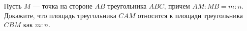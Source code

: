 \begin{ex}
	\begin{condition}
		Пусть \( M \) --- точка на стороне \( AB \) треугольника \( ABC \),
		причем \( AM : MB = m : n \). Докажите, что площадь треугольника \( CAM \) относится к площади треугольника \( CBM \) как \( m : n \).
	\end{condition}
\end{ex}